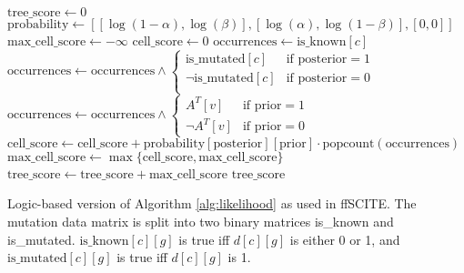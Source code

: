 \begin{algorithm}
    \begin{algorithmic}
            \State $\mathrm{tree\_score} \leftarrow 0$
            \State $\mathrm{probability} \leftarrow [[\log(1-\alpha), \log(\beta)], [\log(\alpha), \log(1-\beta)], [0, 0]]$
             
                \State $\mathrm{max\_cell\_score} \leftarrow -\infty$
                 
                    \State $\mathrm{cell\_score} \leftarrow 0$ 
                     
                         
                            \State $\mathrm{occurrences} \leftarrow \mathrm{is\_known}[c]$ 
                            \State $\mathrm{occurrences} \leftarrow \mathrm{occurrences} \wedge \begin{cases}
                                \mathrm{is\_mutated}[c] & \text{if posterior} = 1 \\
                                \neg \mathrm{is\_mutated}[c] & \text{if posterior} = 0 \\
                            \end{cases}$
                            \State $\mathrm{occurrences} \leftarrow \mathrm{occurrences} \wedge \begin{cases}
                                A^T[v] & \text{if prior} = 1 \\
                                \neg A^T[v] & \text{if prior} = 0 
                            \end{cases}$
                            \State $\mathrm{cell\_score} \leftarrow \mathrm{cell\_score} + \mathrm{probability}[\mathrm{posterior}][\mathrm{prior}] \cdot \mathrm{popcount}(\mathrm{occurrences})$
                        \EndFor
                    \EndFor
                    \State $\mathrm{max\_cell\_score} \leftarrow \max\{\mathrm{cell\_score}, \mathrm{max\_cell\_score}\}$
                \EndFor
                \State $\mathrm{tree\_score} \leftarrow \mathrm{tree\_score} + \mathrm{max\_cell\_score}$
            \EndFor
            \State \Return $\mathrm{tree\_score}$
        \EndFunction
    \end{algorithmic}
    \caption{Logic-based version of Algorithm \ref{alg:likelihood} as used in \ac{ffSCITE}. The mutation data matrix is split into two binary matrices is\_known and is\_mutated. $\mathrm{is\_known}[c][g]$ is true iff $d[c][g]$ is either 0 or 1, and $\mathrm{is\_mutated}[c][g]$ is true iff $d[c][g]$ is 1.}
    \label{alg:likelihood_optimized}
\end{algorithm}